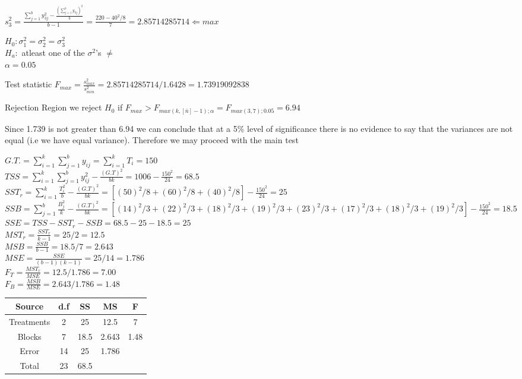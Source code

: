 \documentclass{article}
\begin{document}
\begin{enumerate}[1.]
$s_3^2 = \frac{
\sum_{j=1}^{b} {y_{3j}^2} - \frac{ (\sum_{j=1}^{b}{y_{3j}})^2}{b}
}{
b - 1
}
=
\frac{
220 - 40^2 / 8
}{7}
= 2.85714285714 \Leftarrow max
$

$H_0: \sigma_1^2 = \sigma_2^2 = \sigma_3^2$ \\
$H_a:$ atleast one of the $\sigma^2$'s $\neq $\\
$ \alpha = 0.05$

Test statistic $F_{max} = \frac{s_{max}^2}{s_{min}^2} = 2.85714285714 / 1.6428 = 1.73919092838$

Rejection Region we reject $H_0$ if $F_{max} > F_{max(k, [\bar{n}]-1); \alpha} = F_{max(3, 7); 0.05} = 6.94$

Since 1.739 is not greater than 6.94 we can conclude that at a 5\% level of significance there is no evidence to say that the variances are not equal (i.e we have equal variance). Therefore we may proceed with the main test

$G.T. = \sum_{i=1}^{k}{ \sum_{j=1}^{b}{y_{ij}}} = \sum_{i=1}^{k}{T_i} = 150$ \\
$TSS = \sum_{i=1}^{k}{ \sum_{j=1}^{b}{y_{ij}^2}} - \frac{(G.T)^2}{bk} = 1006 - \frac{150^2}{24} = 68.5$ \\
$SST_r = \sum_{i=1}^{k}{ \frac{T_i^2}{b}} - \frac{(G.T)^2}{bk}  = [(50)^2/8 + (60)^2/8 + (40)^2/8] - \frac{150^2}{24} = 25$ \\
$SSB = \sum_{j=1}^{b}{ \frac{B_j^2}{k} - \frac{(G.T)^2}{bk}}  = [(14)^2/3 + (22)^2/3 + (18)^2/3 + (19)^2/3 + (23)^2/3 + (17)^2/3 + (18)^2/3 + (19)^2/3]  - \frac{150^2}{24} = 18.5$\\
$SSE = TSS - SST_r - SSB = 68.5 - 25 - 18.5= 25$\\

$MST_r = \frac{SST_r}{k - 1} = 25 / 2 = 12.5$ \\
$MSB = \frac{SSB}{b - 1} = 18.5 / 7 = 2.643$ \\
$MSE = \frac{SSE}{(b - 1)(k - 1)} = 25/14 = 1.786$ \\
$F_T = \frac{MST_r}{MSE} = 12.5/1.786 = 7.00$ \\
$F_B = \frac{MSB}{MSE} = 2.643/1.786 = 1.48$ \\


\begin{center}
 \begin{tabular}{||c c c c c||} 
 \hline
Source & d.f & SS & MS & F \\ [0.5ex] 
 \hline\hline
Treatments & 2 & 25 & 12.5 & 7 \\
 \hline
Blocks & 7 & 18.5 & 2.643 & 1.48  \\
\hline
Error & 14 &  25 & 1.786 &  \\
 \hline
Total & 23  &  68.5 & & \\ [1ex]
 \hline
\end{tabular}
\end{center}


\end{enumerate}
\end{document}
